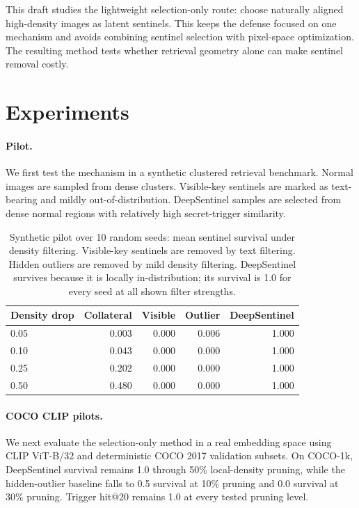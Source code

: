 \documentclass[letterpaper]{article}
\begin{document}
This draft studies the lightweight selection-only route: choose naturally
aligned high-density images as latent sentinels. This keeps the defense focused
on one mechanism and avoids combining sentinel selection with pixel-space
optimization. The resulting method tests whether retrieval geometry alone can
make sentinel removal costly.

\section{Experiments}

\paragraph{Pilot.}
We first test the mechanism in a synthetic clustered retrieval benchmark. Normal
images are sampled from dense clusters. Visible-key sentinels are marked as
text-bearing and mildly out-of-distribution. DeepSentinel samples are selected
from dense normal regions with relatively high secret-trigger similarity.

\begin{table}[t]
\centering
\small
\begin{tabular}{lrrrr}
\toprule
Density drop & Collateral & Visible & Outlier & DeepSentinel \\
\midrule
0.05 & 0.003 & 0.000 & 0.006 & 1.000 \\
0.10 & 0.043 & 0.000 & 0.000 & 1.000 \\
0.25 & 0.202 & 0.000 & 0.000 & 1.000 \\
0.50 & 0.480 & 0.000 & 0.000 & 1.000 \\
\bottomrule
\end{tabular}
\caption{Synthetic pilot over 10 random seeds: mean sentinel survival under
density filtering. Visible-key sentinels are removed by text filtering. Hidden
outliers are removed by mild density filtering. DeepSentinel survives because it
is locally in-distribution; its survival is 1.0 for every seed at all shown
filter strengths.}
\end{table}

\paragraph{COCO CLIP pilots.}
We next evaluate the selection-only method in a real embedding space using
CLIP ViT-B/32 and deterministic COCO 2017 validation subsets. On COCO-1k,
DeepSentinel survival remains 1.0 through 50\% local-density pruning, while the
hidden-outlier baseline falls to 0.5 survival at 10\% pruning and 0.0 survival
at 30\% pruning. Trigger hit@20 remains 1.0 at every tested pruning level.
\end{document}
